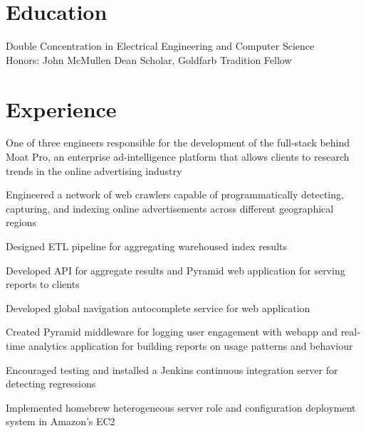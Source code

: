 \documentclass[]{deedy-resume-openfont}
\begin{document}
\lastupdated
{}

\section{Education}
        \hspace{22pt} Double Concentration in Electrical Engineering and Computer Science \\
        \hspace{22pt} Honors: John McMullen Dean Scholar, Goldfarb Tradition Fellow \\
\sectionsep

\section{Experience}

    \begin{tightemize}
        \item
            One of three engineers responsible for the development of the
            full-stack behind Moat Pro, an enterprise ad-intelligence platform
            that allows clients to research trends in the online advertising
            industry
        \item
            Engineered a network of web crawlers capable of programmatically
            detecting, capturing, and indexing online advertisements across
            different geographical regions
        \item
            Designed ETL pipeline for aggregating warehoused index results
        \item
            Developed API for aggregate results and Pyramid web application for
            serving reports to clients
        \item
            Developed global navigation autocomplete service for web application
        \item
            Created Pyramid middleware for logging user engagement with
            webapp and real-time analytics application for building reports on
            usage patterns and behaviour
        \item
            Encouraged testing and installed a Jenkins continuous integration
            server for detecting regressions
        \item
            Implemented homebrew heterogeneous server role and configuration
            deployment system in Amazon’s EC2
    \end{tightemize}
\sectionsep
\end{document}

